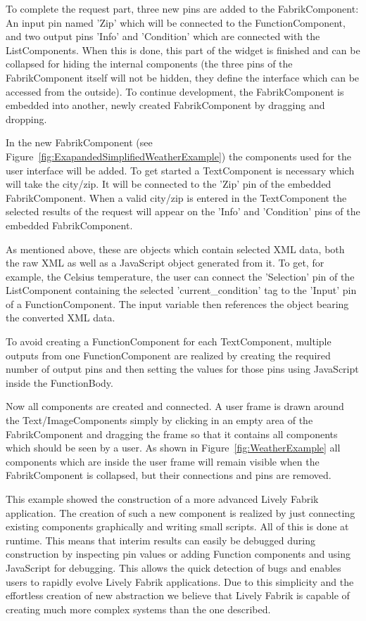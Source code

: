 \documentclass[pdftex, times, 10pt, twocolumn]{article}
\begin{document}
To complete the request part, three new pins are added to the FabrikComponent: An input pin named 'Zip' which will be connected to the FunctionComponent, and two output pins 'Info' and 'Condition' which are connected with the ListComponents. When this is done, this part of the widget is finished and can be collapsed for hiding the internal components (the three pins of the FabrikComponent itself will not be hidden, they define the interface which can be accessed from the outside). To continue development, the FabrikComponent is embedded into another, newly created FabrikComponent by dragging and dropping. 

In the new FabrikComponent (see Figure~\ref{fig:ExapandedSimplifiedWeatherExample}) the components used for the user interface will be added. To get started a TextComponent is necessary which will take the city/zip. It will be connected to the 'Zip' pin of the embedded FabrikComponent. When a valid city/zip is entered in the TextComponent the selected results of the request will appear on the 'Info' and 'Condition' pins of the embedded FabrikComponent. 

As mentioned above, these are objects which contain selected XML data, both the raw XML as well as a JavaScript object generated from it. To get, for example, the Celsius temperature, the user can connect the 'Selection' pin of the ListComponent containing the selected 'current\_condition' tag to the 'Input' pin of a FunctionComponent. The input variable then references the object bearing the converted XML data.  

To avoid creating a FunctionComponent for each TextComponent, multiple outputs from one FunctionComponent are realized by creating the required number of output pins and then setting the values for those  pins using JavaScript inside the FunctionBody. 

Now all components are created and connected. A user frame is drawn around the Text/ImageComponents simply by clicking in an empty area of the FabrikComponent and dragging the frame so that it contains all components which should be seen by a user. As shown in Figure~\ref{fig:WeatherExample} all components which are inside the user frame will remain visible when the FabrikComponent is collapsed, but their connections and pins are removed. 

This example showed the construction of a more advanced Lively Fabrik application. The creation of such a new component is realized by just connecting existing components graphically and writing small scripts. All of this is done at runtime. This means that interim results can easily be debugged during construction by inspecting pin values or adding Function components and using JavaScript for debugging. This allows the quick detection of bugs and enables users to rapidly evolve Lively Fabrik applications. Due to this simplicity and the effortless creation of new abstraction we believe that Lively Fabrik is capable of creating much more complex systems than the one described. 
\end{document}
